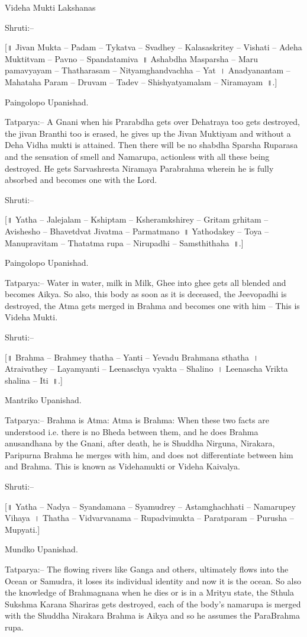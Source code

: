 Videha Mukti Lakshanas

Shruti:–

[॥ Jivan Mukta – Padam – Tykatva – Svadhey – Kalasaskritey – Vishati – Adeha Muktitvam – Pavno – Spandatamiva~॥ Ashabdha Masparsha – Maru pamavyayam – Thatharasam – Nityamghandvachha – Yat~। Anadyanantam – Mahataha Param – Druvam – Tadev – Shishyatyamalam – Niramayam~॥.]

Paingolopo Upanishad.

Tatparya:– A Gnani when his Prarabdha gets over Dehatraya too gets destroyed, the jivan Branthi too is erased, he gives up the Jivan Muktiyam and without a Deha Vidha mukti is attained. Then there will be no shabdha Sparsha Ruparasa and the sensation of smell and Namarupa, actionless with all these being destroyed. He gets Sarvashresta Niramaya Parabrahma wherein he is fully absorbed and becomes one with the Lord.

Shruti:–

[॥ Yatha – Jalejalam – Kshiptam – Ksheramkshirey – Gritam grhitam – Avishesho – Bhavetdvat Jivatma – Parmatmano~॥ Yathodakey – Toya – Manupravitam – Thatatma rupa – Nirupadhi – Samsthithaha~॥.]

Paingolopo Upanishad.

Tatparya:– Water in water, milk in Milk, Ghee into ghee gets all blended and becomes Aikya. So also, this body as soon as it is deceased, the Jeevopadhi is destroyed, the Atma gets merged in Brahma and becomes one with him – This is Videha Mukti.

Shruti:–

[॥ Brahma – Brahmey thatha – Yanti – Yevadu Brahmana sthatha~। Atraivathey – Layamyanti – Leenaschya vyakta – Shalino~। Leenascha Vrikta shalina – Iti~॥.]

Mantriko Upanishad.

Tatparya:– Brahma is Atma: Atma is Brahma: When these two facts are understood i.e. there is no Bheda between them, and he does Brahma anusandhana by the Gnani, after death, he is Shuddha Nirguna, Nirakara, Paripurna Brahma he merges with him, and does not differentiate between him and Brahma. This is known as Videhamukti or Videha Kaivalya.

Shruti:–

[॥ Yatha – Nadya – Syandamana – Syamudrey – Astamghachhati – Namarupey Vihaya~। Thatha – Vidvarvanama – Rupadvimukta – Paratparam – Purusha – Mupyati.]

Mundko Upanishad.

Tatparya:– The flowing rivers like Ganga and others, ultimately flows into the Ocean or Samudra, it loses its individual identity and now it is the ocean. So also the knowledge of Brahmagnana when he dies or is in a Mrityu state, the Sthula Sukshma Karana Shariras gets destroyed, each of the body's namarupa is merged with the Shuddha Nirakara Brahma is Aikya and so he assumes the ParaBrahma rupa.

